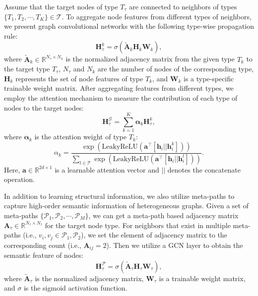 Assume that the target nodes of type $T_\tau$ are connected to neighbors of types $\{T_1,T_2,\cdots,T_K\} \in \mathcal{T}$. To aggregate node features from different types of neighbors, we present graph convolutional networks with the following type-wise propagation rule:
\begin{equation}
    \bm H_\tau^k = \sigma \left(\tilde{\bm A}_k \bm H_k \bm W_k\right),
\end{equation}
where $\tilde{\bm A}_k \in \mathbb{R}^{N_\tau \times N_k}$ is the normalized adjacency matrix from the given type $T_k$ to the target type $T_\tau$, $N_\tau$ and $N_k$ are the number of nodes of the corresponding type, $\bm H_k$ represents the set of node features of type $T_k$, and $\bm W_k$ is a type-specific trainable weight matrix. After aggregating features from different types, we employ the attention mechanism to measure the contribution of each type of nodes to the target nodes:
\begin{equation}\label{equ::structure}
    \bm H_\tau^{\mathcal{G}} = \sum_{k=1}^{K} \bm\alpha_k \bm H_\tau^k,
\end{equation}
where $\bm\alpha_k$ is the attention weight of type $T_k$:
\begin{equation}
    \alpha_k = \frac{\exp(\text{LeakyReLU}(\bm a^\top [\bm h_i||\bm h_i^k]))}{\sum_{l \in \mathcal{T}} \exp(\text{LeakyReLU}(\bm a^\top [\bm h_i||\bm h_i^l]))}.
\end{equation}
Here, $\bm a \in \mathbb{R}^{2d \times 1}$ is a learnable attention vector and $||$ denotes the concatenate operation.

In addition to learning structural information, we also utilize meta-paths to capture high-order semantic information of heterogeneous graphs. Given a set of meta-paths $\{\mathcal{P}_1,\mathcal{P}_2,\cdots,\mathcal{P}_M\}$, we can get a meta-path based adjacency matrix $\bm A_\tau \in \mathbb{R}^{N_\tau \times N_\tau}$ for the target node type. For neighbors that exist in multiple meta-paths (i.e., $v_i,v_j \in \mathcal{P}_1,\mathcal{P}_2$), we set the element of adjacency matrix to the corresponding count (i.e., $\bm A_{ij}=2$). Then we utilize a GCN layer to obtain the semantic feature of nodes:
\begin{equation}\label{equ::semantics}
    \bm H_\tau^{\mathcal{P}} = \sigma \left(\tilde{\bm A}_\tau \bm H_\tau \bm W_\tau\right),
\end{equation}
where $\tilde{\bm A}_\tau$ is the normalized adjacency matrix, $\bm W_\tau$ is a trainable weight matrix, and $\sigma$ is the sigmoid activation function.

